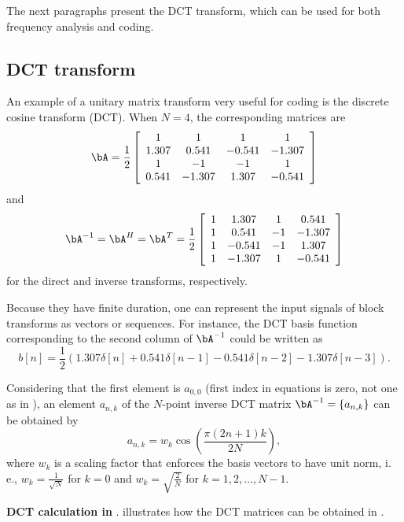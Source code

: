 The next paragraphs present the DCT transform, which can be used for both frequency analysis and coding.

\subsection{DCT transform}

An example of a unitary matrix transform very useful for coding is the discrete cosine transform (DCT). When $N=4$, the corresponding matrices are
\[
\bA = \frac{1}{2}
\left[ \begin{array}{cccc}
 1 &  1 & 1 & 1 \\
 1.307 &  0.541 & -0.541 & -1.307 \\
 1 &  -1 & -1 & 1 \\
 0.541 &  -1.307 & 1.307 & -0.541 \\ \end{array} \right]
\]
and
\[
\bA^{-1} = \bA^H = \bA^T = \frac{1}{2}
\left[ \begin{array}{cccc}
  1 &  1.307 & 1 & 0.541 \\
 1 &  0.541 & -1 & -1.307 \\
 1 &  -0.541 & -1 & 1.307 \\
 1 &  -1.307 & 1 & -0.541 \\ \end{array} \right]
\]
for the direct and inverse transforms, respectively.

Because they have finite duration, one can represent the input signals of block transforms as vectors
or sequences. For instance, the DCT basis function corresponding to the second column of $\bA^{-1}$
could be written as 
\[
b[n] = \frac{1}{2} \left( 1.307 \delta[n] + 0.541 \delta[n-1] - 0.541 \delta[n-2] -1.307 \delta[n-3] \right).
\]

Considering that the first element is $a_{0,0}$ (first index in equations is zero, not one as in \matlab), an element $a_{n,k}$ of the $N$-point inverse DCT matrix $\bA^{-1} = \{ a_{n,k} \}$ can be obtained by
\[
a_{n,k} = w_k \cos \left( \frac{\pi (2 n + 1) k}{2N}  \right),
\]
where $w_k$ is a scaling factor that enforces the basis vectors to have unit norm, i.\,e.,  $w_k = \frac{1}{\sqrt{N}}$ for $k=0$ and $w_k = \sqrt{\frac{2}{N}}$ for $k=1,2,\ldots,N-1$.


\bExample \textbf{DCT calculation in {\matlab}}.
 illustrates how the DCT matrices can be obtained in {\matlab}.

